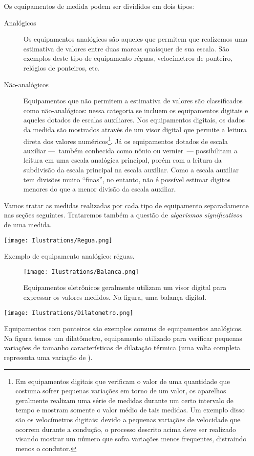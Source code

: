 Os equipamentos de medida podem ser divididos em dois tipos:
\begin{description}
	\item[Analógicos] Os equipamentos analógicos são aqueles que permitem que realizemos uma estimativa de valores entre duas marcas quaisquer de sua escala. São exemplos deste tipo de equipamento réguas, velocímetros de ponteiro, relógios de ponteiros, etc.

	\item[Não-analógicos] Equipamentos que não permitem a estimativa de valores são classificados como não-analógicos: nessa categoria se incluem os equipamentos digitais e aqueles dotados de escalas auxiliares. Nos equipamentos digitais, os dados da medida são mostrados através de um visor digital que permite a leitura direta dos valores numéricos\footnote[][-6cm]{Em equipamentos digitais que verificam o valor de uma quantidade que costuma sofrer pequenas variações em torno de um valor, os aparelhos geralmente realizam uma série de medidas durante um certo intervalo de tempo e mostram somente o valor médio de tais medidas. Um exemplo disso são os velocímetros digitais: devido a pequenas variações de velocidade que ocorrem durante a condução, o processo descrito acima deve ser realizado visando mostrar um número que sofra variações menos frequentes, distraindo menos o condutor.}. Já os equipamentos dotados de escala auxiliar ---~também conhecida como nônio ou vernier~--- possibilitam a leitura em uma escala analógica principal, porém com a leitura da subdivisão da escala principal na escala auxiliar. Como a escala auxiliar tem divisões muito ``finas'', no entanto, não é possível estimar digitos menores do que a menor divisão da escala auxiliar.
\end{description}
%
Vamos tratar as medidas realizadas por cada tipo de equipamento separadamente nas seções seguintes. Trataremos também a questão de \emph{algarismos significativos} de uma medida.
\begin{marginfigure}[-3cm]
	\texttt{[image: Ilustrations/Regua.png]}
	\caption{Exemplo de equipamento analógico: réguas.}
\end{marginfigure}
%
\begin{figure}
	\centering
	\texttt{[image: Ilustrations/Balanca.png]}
	\caption{Equipamentos eletrônicos geralmente utilizam um visor digital para expressar os valores medidos. Na figura, uma balança digital.}
\end{figure}
%
\begin{marginfigure}[2cm]
	\texttt{[image: Ilustrations/Dilatometro.png]}
	\caption{Equipamentos com ponteiros são exemplos comuns de equipamentos analógicos. Na figura temos um dilatômetro, equipamento utilizado para verificar pequenas variações de tamanho características de dilatação térmica (uma volta completa representa uma variação de ).}
\end{marginfigure}
%

